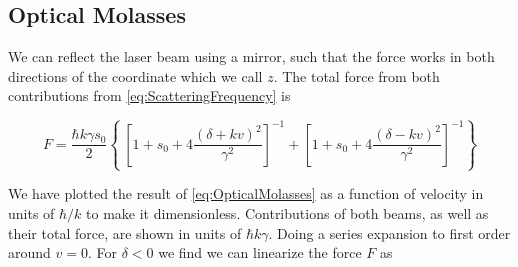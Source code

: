 \subsection{Optical Molasses}

We can reflect the laser beam using a mirror, such that the force works in both directions of the coordinate which we call $z$. The total force from both contributions from \cref{eq:ScatteringFrequency} is \cite{Kowalski2010}

\begin{equation}\label{eq:OpticalMolasses}
	F = \frac{\hbar k \gamma s_0}{2}\left\{\
	\left[1 + s_0 + 4\frac{(\delta+kv)^2}{\gamma^2}\right]^{-1}+
	\left[1 + s_0 + 4\frac{(\delta-kv)^2}{\gamma^2}\right]^{-1}
	\right\}
\end{equation}

We have plotted the result of \cref{eq:OpticalMolasses} as a function of velocity in units of $\hbar / k$ to make it dimensionless. Contributions of both beams, as well as their total force, are shown in units of $\hbar k \gamma$. Doing a series expansion to first order around $v = 0$. For $\delta<0$ we find we can linearize the force $F$ as 


